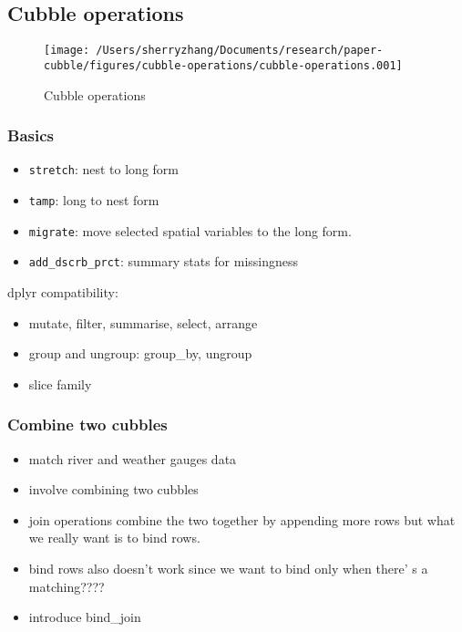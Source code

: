 \documentclass[
]{jss}
\providecommand{\tightlist}{%
  \setlength{\itemsep}{0pt}\setlength{\parskip}{0pt}}
\begin{document}
\newpage

\hypertarget{cubble-operations}{%
\subsection{Cubble operations}\label{cubble-operations}}

\begin{CodeChunk}
\begin{figure}

{\centering \texttt{[image: /Users/sherryzhang/Documents/research/paper-cubble/figures/cubble-operations/cubble-operations.001]} 

}

\caption[Cubble operations]{Cubble operations}\label{fig:cubble-operations}
\end{figure}
\end{CodeChunk}

\hypertarget{basics}{%
\subsubsection{Basics}\label{basics}}

\begin{itemize}
\tightlist
\item
  \texttt{stretch}: nest to long form
\item
  \texttt{tamp}: long to nest form
\item
  \texttt{migrate}: move selected spatial variables to the long form.
\item
  \texttt{add\_dscrb\_prct}: summary stats for missingness
\end{itemize}

dplyr compatibility:

\begin{itemize}
\tightlist
\item
  mutate, filter, summarise, select, arrange
\item
  group and ungroup: group\_by, ungroup
\item
  slice family
\end{itemize}

\hypertarget{combine-two-cubbles}{%
\subsubsection{Combine two cubbles}\label{combine-two-cubbles}}

\begin{itemize}
\tightlist
\item
  match river and weather gauges data
\item
  involve combining two cubbles
\item
  join operations combine the two together by appending more rows but
  what we really want is to bind rows.
\item
  bind rows also doesn't work since we want to bind only when there' s a
  matching????
\item
  introduce bind\_join
\end{itemize}
\end{document}

